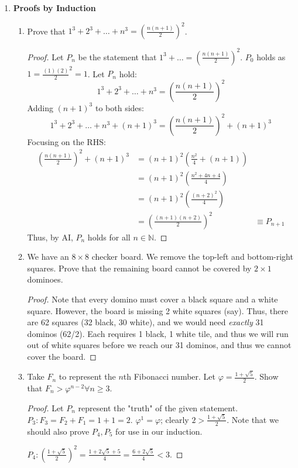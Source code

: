 \documentclass[12pt]{article}
\begin{document}
\begin{enumerate}
  \item \textbf{Proofs by Induction}
  \begin{enumerate}
    \item Prove that $1^3 + 2^3 + \dots + n^3 = \left(\frac{n(n+1)}{2}\right)^2$.
    \begin{proof}
      Let $P_n$ be the statement that $1^3 + \dots = \left(\frac{n(n+1)}{2}\right)^2$. $P_0$ holds as $1 = \frac{(1)(2)}{2}^2 = 1$. Let $P_n$ hold: \[1^3 + 2^3 + \dots + n^3 = \left(\frac{n(n+1)}{2}\right)^2\]
      Adding $(n+1)^3$ to both sides:
      \[
        1^3 + 2^3 + \dots + n^3 + (n+1)^3 = \left(\frac{n(n+1)}{2}\right)^2 + (n+1)^3
      \]
      Focusing on the RHS:
      \begin{align*}
        \left(\frac{n(n+1)}{2}\right)^2 + (n+1)^3 &= (n+1)^2\left(\frac{n^2}{4} + (n+1)\right)\\
        &= (n+1)^2\left(\frac{n^2 + 4n + 4}{4}\right)\\
        &= (n+1)^2\left(\frac{(n+2)^2}{4}\right)\\
        &= \left(\frac{(n+1)(n+2)}{2}\right)^2
        & \equiv P_{n+1}
      \end{align*}
      Thus, by AI, $P_n$ holds for all $n \in \mathbb{N}$.
    \end{proof}
    \item We have an $8\times 8$ checker board. We remove the top-left and bottom-right squares. Prove that the remaining board cannot be covered by $2\times 1$ dominoes.
    \begin{proof}[Proof]
      Note that every domino must cover a black square and a white square. However, the board is missing 2 white squares (say). Thus, there are 62 squares (32 black, 30 white), and we would need \emph{exactly} 31 dominos (62/2). Each requires 1 black, 1 white tile, and thus we will run out of white squares before we reach our 31 dominos, and thus we cannot cover the board.
    \end{proof}
    \item Take $F_n$ to represent the $n$th Fibonacci number. Let $\varphi = \frac{1+\sqrt{5}}{2}$. Show that $F_n > \varphi^{n-2} \forall n \geq 3$.
    \begin{proof}[Proof]
      Let $P_n$ represent the "truth" of the given statement. $P_3: F_3 = F_2 + F_1 = 1 + 1 =2$. $\varphi^{1} = \varphi$; clearly $2 > \frac{1+\sqrt{5}}{2}$. Note that we should also prove $P_4, P_5$ for use in our induction.

      $P_4: (\frac{1+\sqrt{5}}{2})^2 = \frac{1 + 2 \sqrt{5} + 5}{4} = \frac{6+2\sqrt{5}}{4} < 3$.


\end{proof}
\end{enumerate}
\end{enumerate}
\end{document}
